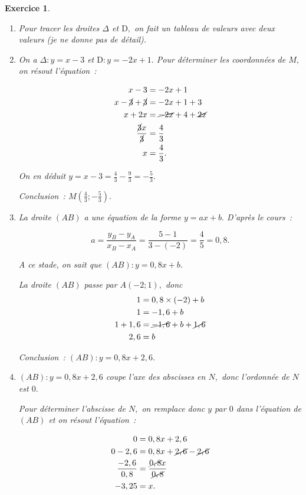 \documentclass[10pt]{article}
\newtheorem{exo}{Exercice}
\begin{document}
\begin{exo}


\begin{enumerate}
\item Pour tracer les droites $\Delta$ et $\mathrm{D},$ on fait un tableau de valeurs avec deux valeurs (je ne donne pas de détail).
\item On a $\Delta:y=x-3$ et $\mathrm{D}:y=-2x+1.$ Pour déterminer les coordonnées de $M,$ on résout l'équation~:

\begin{align*}
x-3&=-2x+1\\
x-\cancel{3}+\cancel{3}&=-2x+1+3\\
x+2x&=\cancel{-2x}+4+\cancel{2x}\\
\frac{\cancel{3}x}{\cancel{3}}&=\frac{4}{3}\\
x&=\frac{4}{3}.
\end{align*}

On en déduit $y=x-3=\frac{4}{3}-\frac{9}{3}=-\frac{5}{3}.$

Conclusion~: $M\left(\frac{4}{3};-\frac{5}{3}\right).$
\item La droite $(AB)$ a une équation de la forme $y=ax+b.$ D'après le cours~:

\[a=\frac{y_B-y_A}{x_B-x_A}=\frac{5-1}{3-(-2)}=\frac{4}{5}=0,8.\]

A ce stade, on sait que $(AB):y=0,8x+b.$

\medskip

La droite $(AB)$ passe par $A(-2;1),$ donc
\begin{align*}1&=0,8\times (-2)+b\\
1&=-1,6+b\\
1+1,6&=\cancel{-1,6}+b+\cancel{1,6}\\
2,6&=b
\end{align*}


Conclusion~: $(AB):y=0,8x+2,6.$

\item $(AB):y=0,8x+2,6$ coupe l'axe des abscisses en $N,$ donc l'ordonnée de $N$ est $0.$

Pour déterminer l'abscisse de $N,$ on remplace donc $y$ par $0$ dans l'équation de $(AB)$ et on résout l'équation~:

\begin{align*}
0&=0,8x+2,6\\
0-2,6&=0,8x+\cancel{2,6}-\cancel{2,6}\\
\frac{-2,6}{0,8}&=\frac{\cancel{0,8}x}{\cancel{0,8}}\\
-3,25&=x.\end{align*}


\end{enumerate}
\end{exo}
\end{document}

